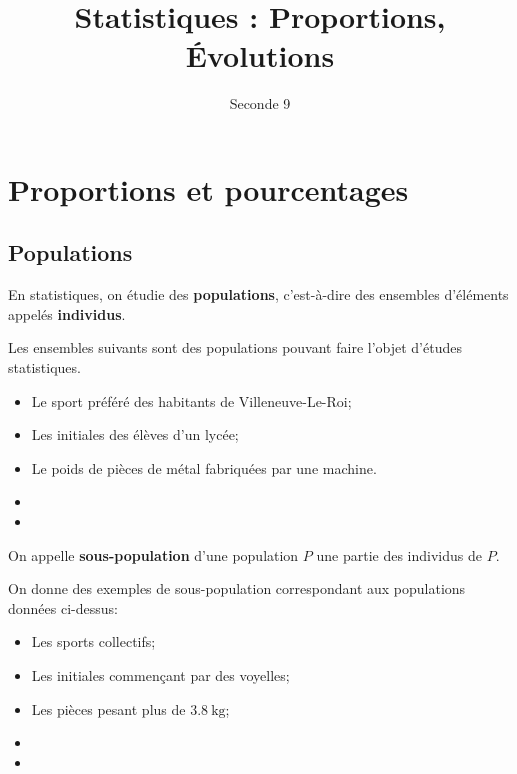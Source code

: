 \documentclass{article}
\title{Statistiques : Proportions, Évolutions}
\date{}
\author{Seconde 9}
\begin{document}
\maketitle

\section{Proportions et pourcentages}
\subsection{Populations}
\begin{tcolorbox}
\begin{definition}
En statistiques, on étudie des \textbf{populations}, c'est-à-dire des ensembles d'éléments appelés \textbf{individus}.  
\end{definition}
\end{tcolorbox}
\begin{example} 
Les ensembles suivants sont des populations pouvant faire l'objet d'études statistiques. 
\begin{itemize}
\item Le sport préféré des habitants de Villeneuve-Le-Roi;
\item Les initiales des élèves d'un lycée;
\item Le poids de pièces de métal fabriquées par une machine.
\item
\item 
\end{itemize}
\end{example}
\begin{tcolorbox}
\begin{definition}
On appelle \textbf{sous-population} d'une population $P$ une partie des individus de $P$.
\end{definition}
\end{tcolorbox}
\begin{example}
On donne des exemples de sous-population correspondant aux populations données ci-dessus:
\begin{itemize}
\item Les sports collectifs;
\item Les initiales commençant par des voyelles;
\item Les pièces pesant plus de $\qty{3,8}{\kilo\gram}$;
\item 
\item 
\end{itemize}
\end{example}
\end{document}
